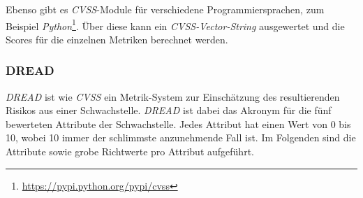 		Ebenso gibt es \textit{CVSS}-Module für verschiedene Programmiersprachen, zum Beispiel \textit{Python}\footnote{\url{https://pypi.python.org/pypi/cvss}}. Über diese kann ein\textit{ CVSS-Vector-String} ausgewertet und die Scores für die einzelnen Metriken berechnet werden.

		\subsubsection{DREAD}
		
		\textit{DREAD} ist wie \textit{CVSS} ein Metrik-System zur Einschätzung des resultierenden Risikos aus einer Schwachstelle. \textit{DREAD} ist dabei das Akronym für die fünf bewerteten Attribute der Schwachstelle. Jedes Attribut hat einen Wert von 0 bis 10, wobei 10 immer der schlimmste anzunehmende Fall ist. Im Folgenden sind die Attribute sowie grobe Richtwerte pro Attribut aufgeführt.\cite{DREADOWASP}
		

